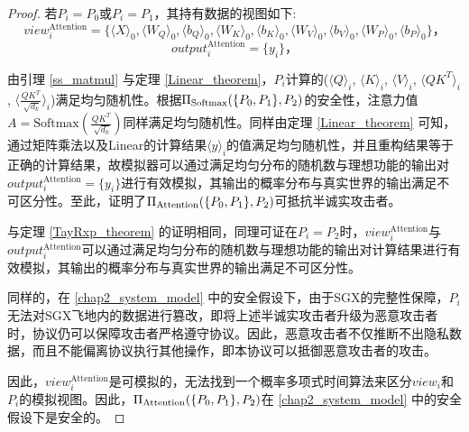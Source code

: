 \begin{proof}
	若$P_i=P_0$或$P_i=P_1$，其持有数据的视图如下:
	$$view_i^{\text{Attention}}=\{\langle X\rangle_0, \langle W_Q\rangle_0, \langle b_Q\rangle_0, \langle W_K\rangle_0, \langle b_K\rangle_0, \langle W_V\rangle_0, \langle b_V\rangle_0, \langle W_P\rangle_0, \langle b_P\rangle_0\}\text{，}$$
	$$output_i^{\text{Attention}}=\{y_i\}\text{，}$$
	
	由引理 \ref{ss_matmul} 与定理 \ref{Linear_theorem}，$P_i$计算的($\langle Q\rangle_i$, $\langle K\rangle_i$, $\langle V\rangle_i$, $\langle QK^T\rangle_i$, $\langle\frac{ QK^T }{\sqrt[]{d_k}}\rangle_i$)满足均匀随机性。根据$\Pi_{\rm \text{Softmax}}(\{P_0, P_1\}, P_2)$的安全性，注意力值$A=\text{Softmax}(\frac{ QK^T }{\sqrt[]{d_k}})$同样满足均匀随机性。同样由定理 \ref{Linear_theorem} 可知，通过矩阵乘法以及Linear的计算结果$\langle y\rangle_i$的值满足均匀随机性，并且重构结果等于正确的计算结果，故模拟器可以通过满足均匀分布的随机数与理想功能的输出对$output_i^{\text{Attention}}=\{y_i\}$进行有效模拟，其输出的概率分布与真实世界的输出满足不可区分性。至此，证明了$\Pi_{\rm Attention}(\{P_0, P_1\}, P_2)$可抵抗半诚实攻击者。
	
	与定理 \ref{TayRxp_theorem} 的证明相同，同理可证在$P_i=P_2$时，$view_i^{\text{Attention}}$与$output_i^{\text{Attention}}$可以通过满足均匀分布的随机数与理想功能的输出对计算结果进行有效模拟，其输出的概率分布与真实世界的输出满足不可区分性。
	
	同样的，在 \ref{chap2_system_model} 中的安全假设下，由于SGX的完整性保障\cite{SGX_Explained}，$P_i$无法对SGX飞地内的数据进行篡改，即将上述半诚实攻击者升级为恶意攻击者时，协议仍可以保障攻击者严格遵守协议。因此，恶意攻击者不仅推断不出隐私数据，而且不能偏离协议执行其他操作，即本协议可以抵御恶意攻击者的攻击。
	
	因此，$view_i^{\text{Attention}}$是可模拟的，无法找到一个概率多项式时间算法来区分$view_i$和$P_i$的模拟视图。因此，$\Pi_{\rm Attention}(\{P_0, P_1\}, P_2)$在 \ref{chap2_system_model} 中的安全假设下是安全的。
	
\end{proof}





